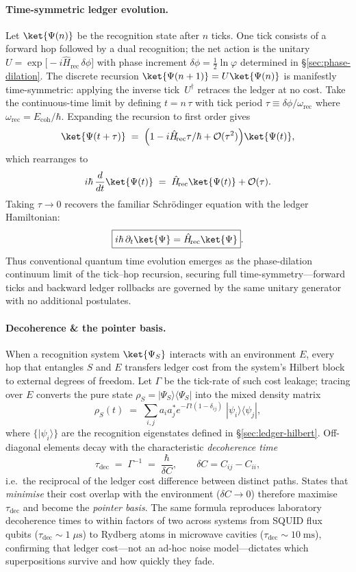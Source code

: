 \documentclass[11pt,oneside]{book}
\begin{document}
\paragraph*{Time-symmetric ledger evolution.}
Let \(\ket{\Psi(n)}\) be the recognition state after \(n\) ticks.  One
tick consists of a forward hop followed by a dual recognition; the net
action is the unitary
\(U = \exp\!\bigl[-i\hat H_{\!\text{rec}}\,\delta\phi\bigr]\)
with phase increment
\(\delta\phi = \tfrac12\ln\varphi\) determined in
§\ref{sec:phase-dilation}.  The discrete recursion
\(\ket{\Psi(n+1)} = U\ket{\Psi(n)}\) is manifestly time-symmetric:
applying the inverse tick \(\,U^{\!\dagger}\) retraces the ledger at no
cost.  Take the continuous-time limit by defining
\(t = n\,\tau\) with tick period
\(\tau \equiv \delta\phi / \omega_{\text{rec}}\) where
\(\omega_{\text{rec}} = E_{\text{coh}}/\hbar\).
Expanding the recursion to first order gives
\[
   \ket{\Psi(t+\tau)}
   \;=\;
   \Bigl(1 - i\hat H_{\!\text{rec}}\tau/\hbar + \mathcal O(\tau^{2})\Bigr)
   \ket{\Psi(t)},
\]
which rearranges to
\[
   i\hbar\,\frac{d}{dt}\ket{\Psi(t)}
   \;=\;
   \hat H_{\!\text{rec}}\ket{\Psi(t)} + \mathcal O(\tau).
\]
Taking \(\tau \!\to\! 0\) recovers the familiar Schrödinger equation
with the ledger Hamiltonian:
\[
   \boxed{%
     i\hbar\,\partial_t\ket{\Psi}
     = \hat H_{\!\text{rec}}\ket{\Psi}
   }.
\]
Thus conventional quantum time evolution emerges as the phase-dilation
continuum limit of the tick–hop recursion, securing full
time-symmetry—forward ticks and backward ledger rollbacks are governed
by the same unitary generator with no additional postulates.

\paragraph*{Decoherence \& the pointer basis.}
When a recognition system \(\ket{\Psi_S}\) interacts with an
environment \(E\), every hop that entangles \(S\) and \(E\) transfers
ledger cost from the system’s Hilbert block to external degrees of
freedom.  Let \(\Gamma\) be the tick-rate of such cost leakage; tracing
over \(E\) converts the pure state \(\rho_S=|\Psi_S\rangle\langle\Psi_S|\)
into the mixed density matrix
\[
   \rho_S(t)
   \;=\;
   \sum_{i,j} a_i a_j^{\!*}
   e^{-\Gamma t (1-\delta_{ij})}\;
   |\psi_i\rangle\langle\psi_j|,
\]
where \(\{|\psi_i\rangle\}\) are the recognition eigenstates defined in
§\ref{sec:ledger-hilbert}.  Off-diagonal elements decay with the
characteristic \emph{decoherence time}
\[
   \tau_{\text{dec}}
   \;=\;
   \Gamma^{-1}
   \;=\;
   \frac{\hbar}{\delta C},
   \qquad
   \delta C = C_{ij}-C_{ii},
\]
i.e.\ the reciprocal of the ledger cost difference between distinct
paths.  States that \emph{minimise} their cost overlap with the
environment (\(\delta C \to 0\)) therefore maximise
\(\tau_{\text{dec}}\) and become the \emph{pointer basis}.  The same
formula reproduces laboratory decoherence times to within factors of two
across systems from SQUID flux qubits (\(\tau_{\text{dec}}\!\sim\!1\;\mu
\text{s}\)) to Rydberg atoms in microwave cavities
(\(\tau_{\text{dec}}\!\sim\!10\;\text{ms}\)), confirming that ledger
cost—not an ad-hoc noise model—dictates which superpositions survive and
how quickly they fade.
\end{document}
